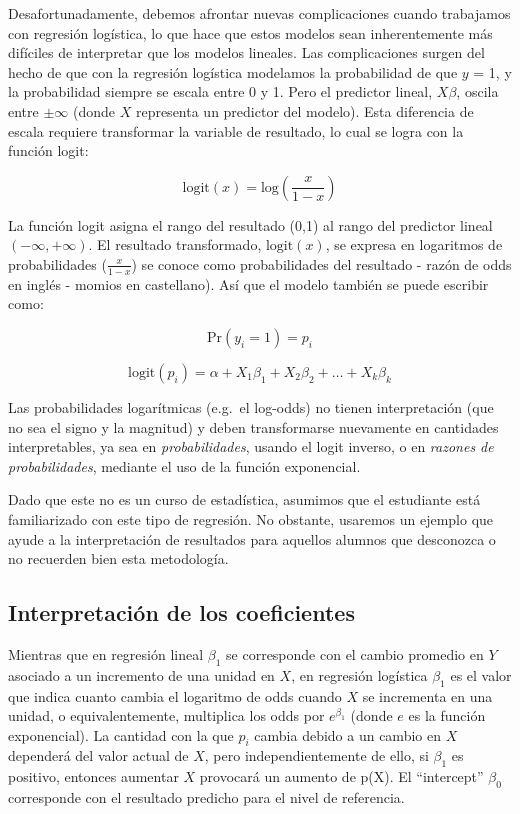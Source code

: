 \documentclass[
]{book}
\begin{document}
Desafortunadamente, debemos afrontar nuevas complicaciones cuando trabajamos con regresión logística, lo que hace que estos modelos sean inherentemente más difíciles de interpretar que los modelos lineales. Las complicaciones surgen del hecho de que con la regresión logística modelamos la probabilidad de que \(y\) = 1, y la probabilidad siempre se escala entre 0 y 1. Pero el predictor lineal, \(X \beta\), oscila entre \(\pm \infty\) (donde \(X\) representa un predictor del modelo). Esta diferencia de escala requiere transformar la variable de resultado, lo cual se logra con la función logit:

\[
\text{logit}(x) = \text{log}\left( \frac{x}{1-x} \right)
\]

La función logit asigna el rango del resultado (0,1) al rango del predictor lineal \((-\infty, +\infty)\). El resultado transformado, \(\text{logit} (x)\), se expresa en logaritmos de probabilidades (\(\frac{x}{1-x}\)) se conoce como probabilidades del resultado - razón de odds en inglés - momios en castellano). Así que el modelo también se puede escribir como:

\[\text{Pr}(y_i = 1) = p_i\]

\[\text{logit}(p_i) =  \alpha + X_1\beta_1 + X_2\beta_2 + \ldots + X_k\beta_k\]

Las probabilidades logarítmicas (e.g.~el log-odds) no tienen interpretación (que no sea el signo y la magnitud) y deben transformarse nuevamente en cantidades interpretables, ya sea en \emph{probabilidades}, usando el logit inverso, o en \emph{razones de probabilidades}, mediante el uso de la función exponencial.

Dado que este no es un curso de estadística, asumimos que el estudiante está familiarizado con este tipo de regresión. No obstante, usaremos un ejemplo que ayude a la interpretación de resultados para aquellos alumnos que desconozca o no recuerden bien esta metodología.

\hypertarget{interpretaciuxf3n-de-los-coeficientes}{%
\subsection{Interpretación de los coeficientes}\label{interpretaciuxf3n-de-los-coeficientes}}

Mientras que en regresión lineal \(\beta_1\) se corresponde con el cambio promedio en \(Y\) asociado a un incremento de una unidad en \(X\), en regresión logística \(\beta_1\) es el valor que indica cuanto cambia el logaritmo de odds cuando \(X\) se incrementa en una unidad, o equivalentemente, multiplica los odds por \(e^{\beta_1}\) (donde \(e\) es la función exponencial). La cantidad con la que \(p_i\) cambia debido a un cambio en \(X\) dependerá del valor actual de \(X\), pero independientemente de ello, si \(\beta_1\) es positivo, entonces aumentar \(X\) provocará un aumento de p(X). El ``intercept'' \(\beta_0\) corresponde con el resultado predicho para el nivel de referencia.
\end{document}
